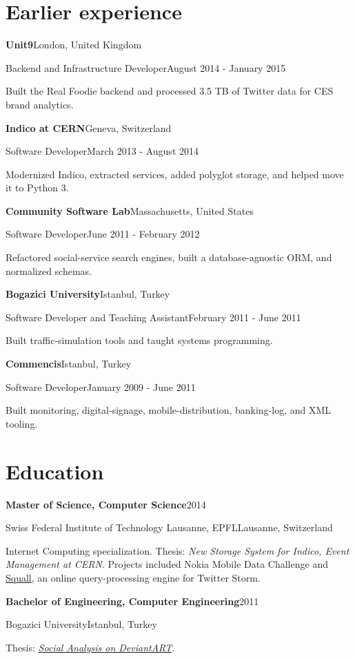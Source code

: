 \documentclass[11pt,a4paper]{article}
\newcommand{\compactrole}[4]{%
  {\bfseries\color{ink}#1}\hfill{\small\color{muted}#2}\par
  {\small\color{accent}#3}\hfill{\small\color{muted}#4}\par
}
\newcommand{\compactdetail}[1]{%
  {\small #1}\par\vspace{3pt}
}
\begin{document}
\section{Earlier experience}

\compactrole{Unit9}{London, United Kingdom}{Backend and Infrastructure Developer}{August 2014 - January 2015}
\compactdetail{Built the Real Foodie backend and processed 3.5 TB of Twitter data for CES brand analytics.}

\compactrole{Indico at CERN}{Geneva, Switzerland}{Software Developer}{March 2013 - August 2014}
\compactdetail{Modernized Indico, extracted services, added polyglot storage, and helped move it to Python 3.}

\compactrole{Community Software Lab}{Massachusetts, United States}{Software Developer}{June 2011 - February 2012}
\compactdetail{Refactored social-service search engines, built a database-agnostic ORM, and normalized schemas.}

\compactrole{Bogazici University}{Istanbul, Turkey}{Software Developer and Teaching Assistant}{February 2011 - June 2011}
\compactdetail{Built traffic-simulation tools and taught systems programming.}

\compactrole{Commencis}{Istanbul, Turkey}{Software Developer}{January 2009 - June 2011}
\compactdetail{Built monitoring, digital-signage, mobile-distribution, banking-log, and XML tooling.}

\section{Education}

{\bfseries\color{ink}Master of Science, Computer Science}\hfill{\small\color{muted}2014}\par
{\color{accent}Swiss Federal Institute of Technology Lausanne, EPFL}\hfill{\small\color{muted}Lausanne, Switzerland}\par
{\small Internet Computing specialization. Thesis: \textit{New Storage System for Indico, Event Management at CERN}. Projects included Nokia Mobile Data Challenge and \href{https://github.com/epfldata/squall}{Squall}, an online query-processing engine for Twitter Storm.}

\vspace{5pt}
{\bfseries\color{ink}Bachelor of Engineering, Computer Engineering}\hfill{\small\color{muted}2011}\par
{\color{accent}Bogazici University}\hfill{\small\color{muted}Istanbul, Turkey}\par
{\small Thesis: \href{https://github.com/ferhatelmas/deviantART-analysis}{\textit{Social Analysis on DeviantART}}.}
\end{document}
